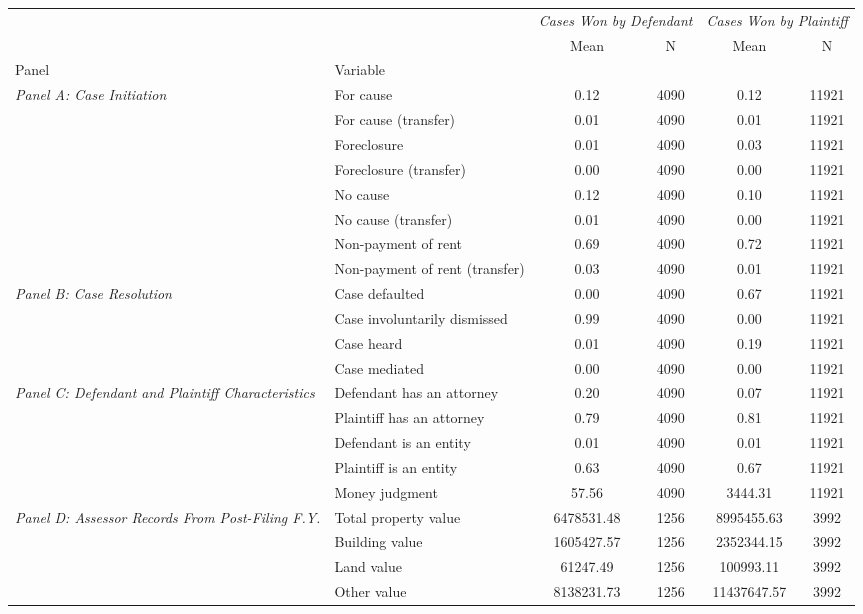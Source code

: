 \begin{tabular}{llcccc}
\toprule
 &  & \multicolumn{2}{c}{\textit{Cases Won by Defendant}} & \multicolumn{2}{c}{\textit{Cases Won by Plaintiff}} \\
 &  & Mean & N & Mean & N \\
Panel & Variable &  &  &  &  \\
\midrule
\multirow[c]{8}{4cm}{\textit{Panel A: Case Initiation}} & For cause & 0.12 & 4090 & 0.12 & 11921 \\
 & For cause (transfer) & 0.01 & 4090 & 0.01 & 11921 \\
 & Foreclosure & 0.01 & 4090 & 0.03 & 11921 \\
 & Foreclosure (transfer) & 0.00 & 4090 & 0.00 & 11921 \\
 & No cause & 0.12 & 4090 & 0.10 & 11921 \\
 & No cause (transfer) & 0.01 & 4090 & 0.00 & 11921 \\
 & Non-payment of rent & 0.69 & 4090 & 0.72 & 11921 \\
 & Non-payment of rent (transfer) & 0.03 & 4090 & 0.01 & 11921 \\
\cline{1-6}
\multirow[c]{4}{4cm}{\textit{Panel B: Case Resolution}} & Case defaulted & 0.00 & 4090 & 0.67 & 11921 \\
 & Case involuntarily dismissed & 0.99 & 4090 & 0.00 & 11921 \\
 & Case heard & 0.01 & 4090 & 0.19 & 11921 \\
 & Case mediated & 0.00 & 4090 & 0.00 & 11921 \\
\cline{1-6}
\multirow[c]{5}{4cm}{\textit{Panel C: Defendant and Plaintiff Characteristics}} & Defendant has an attorney & 0.20 & 4090 & 0.07 & 11921 \\
 & Plaintiff has an attorney & 0.79 & 4090 & 0.81 & 11921 \\
 & Defendant is an entity & 0.01 & 4090 & 0.01 & 11921 \\
 & Plaintiff is an entity & 0.63 & 4090 & 0.67 & 11921 \\
 & Money judgment & 57.56 & 4090 & 3444.31 & 11921 \\
\cline{1-6}
\multirow[c]{5}{4cm}{\textit{Panel D: Assessor Records From Post-Filing F.Y.}} & Total property value & 6478531.48 & 1256 & 8995455.63 & 3992 \\
 & Building value & 1605427.57 & 1256 & 2352344.15 & 3992 \\
 & Land value & 61247.49 & 1256 & 100993.11 & 3992 \\
 & Other value & 8138231.73 & 1256 & 11437647.57 & 3992 \\

\end{tabular}
